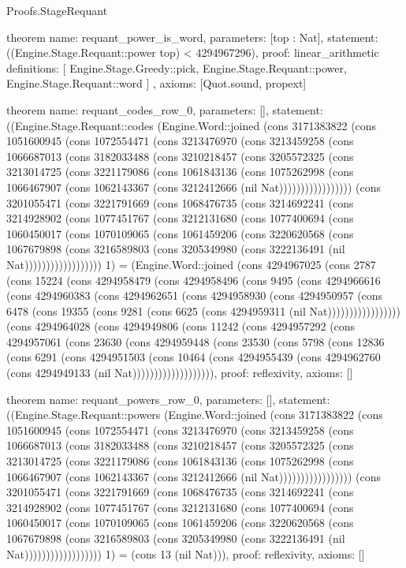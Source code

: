 \begin{lexlean}{Proofs.StageRequant}
\begin{semanticmodule}
theorem{
  name: requant_power_is_word,
  parameters: [top : Nat],
  statement: ((Engine.Stage.Requant::power top) < 4294967296),
  proof: linear_arithmetic{
    definitions: [
      Engine.Stage.Greedy::pick,
      Engine.Stage.Requant::power,
      Engine.Stage.Requant::word
    ]
  },
  axioms: [Quot.sound, propext]
}

theorem{
  name: requant_codes_row_0,
  parameters: [],
  statement: ((Engine.Stage.Requant::codes (Engine.Word::joined (cons 3171383822 (cons 1051600945 (cons 1072554471 (cons 3213476970 (cons 3213459258 (cons 1066687013 (cons 3182033488 (cons 3210218457 (cons 3205572325 (cons 3213014725 (cons 3221179086 (cons 1061843136 (cons 1075262998 (cons 1066467907 (cons 1062143367 (cons 3212412666 (nil Nat))))))))))))))))) (cons 3201055471 (cons 3221791669 (cons 1068476735 (cons 3214692241 (cons 3214928902 (cons 1077451767 (cons 3212131680 (cons 1077400694 (cons 1060450017 (cons 1070109065 (cons 1061459206 (cons 3220620568 (cons 1067679898 (cons 3216589803 (cons 3205349980 (cons 3222136491 (nil Nat)))))))))))))))))) 1) = (Engine.Word::joined (cons 4294967025 (cons 2787 (cons 15224 (cons 4294958479 (cons 4294958496 (cons 9495 (cons 4294966616 (cons 4294960383 (cons 4294962651 (cons 4294958930 (cons 4294950957 (cons 6478 (cons 19355 (cons 9281 (cons 6625 (cons 4294959311 (nil Nat))))))))))))))))) (cons 4294964028 (cons 4294949806 (cons 11242 (cons 4294957292 (cons 4294957061 (cons 23630 (cons 4294959448 (cons 23530 (cons 5798 (cons 12836 (cons 6291 (cons 4294951503 (cons 10464 (cons 4294955439 (cons 4294962760 (cons 4294949133 (nil Nat))))))))))))))))))),
  proof: reflexivity{},
  axioms: []
}

theorem{
  name: requant_powers_row_0,
  parameters: [],
  statement: ((Engine.Stage.Requant::powers (Engine.Word::joined (cons 3171383822 (cons 1051600945 (cons 1072554471 (cons 3213476970 (cons 3213459258 (cons 1066687013 (cons 3182033488 (cons 3210218457 (cons 3205572325 (cons 3213014725 (cons 3221179086 (cons 1061843136 (cons 1075262998 (cons 1066467907 (cons 1062143367 (cons 3212412666 (nil Nat))))))))))))))))) (cons 3201055471 (cons 3221791669 (cons 1068476735 (cons 3214692241 (cons 3214928902 (cons 1077451767 (cons 3212131680 (cons 1077400694 (cons 1060450017 (cons 1070109065 (cons 1061459206 (cons 3220620568 (cons 1067679898 (cons 3216589803 (cons 3205349980 (cons 3222136491 (nil Nat)))))))))))))))))) 1) = (cons 13 (nil Nat))),
  proof: reflexivity{},
  axioms: []
}


\end{semanticmodule}
\end{lexlean}
